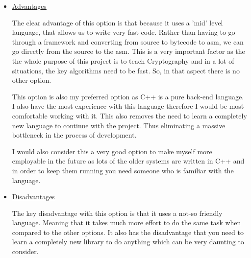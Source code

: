\begin{itemize}
\item{
\underline{Advantages}

The clear advantage of this option is that because it uses a 'mid' level language, that allows us to write very fast code. Rather than having to go through a framework and converting from source to bytecode to asm, we can go directly from the source to the asm. This is a very important factor as the the whole purpose of this project is to teach Cryptography and in a lot of situations, the key algorithms need to be fast. So, in that aspect there is no other option.

This option is also my preferred option as C++ is a pure back-end language. I also have the most experience with this language therefore I would be most comfortable working with it. This also removes the need to learn a completely new language to continue with the project. Thus eliminating a massive bottleneck in the process of development.

I would also consider this a very good option to make myself more employable in the future as lots of the older systems are written in C++ and in order to keep them running you need someone who is familiar with the language. 

}
\item{
\underline{Disadvantages}

The key disadvantage with this option is that it uses a not-so friendly language. Meaning that it takes much more effort to do the same task when compared to the other options. It also has the disadvantage that you need to learn a completely new library to do anything which can be very daunting to consider. 

}
\end{itemize}

